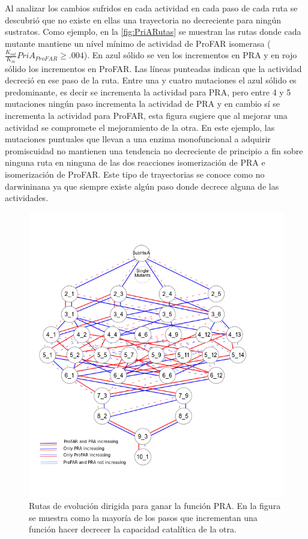 \documentclass[12pt,twoside]{reedthesis}
\begin{document}
  Al analizar los cambios sufridos en cada actividad en cada paso de cada
  ruta se descubrió que no existe en ellas una trayectoria no decreciente
  para ningún sustratos. Como ejemplo, en la \autoref{fig:PriARutas} se
  muestran las rutas donde cada mutante mantiene un nível mínimo de
  actividad de ProFAR isomerasa
  (\(\frac{K_{cat}}{K_m} PriA_{ProFAR} \ge .004\)). En azul sólido se ven
  los incrementos en PRA y en rojo sólido los incrementos en ProFAR. Las
  líneas punteadas indican que la actividad decreció en ese paso de la
  ruta. Entre una y cuatro mutaciones el azul sólido es predominante, es
  decir se incrementa la actividad para PRA, pero entre 4 y 5 mutaciones
  ningún paso incrementa la actividad de PRA y en cambio sí se incrementa
  la actividad para ProFAR, esta figura sugiere que al mejorar una
  actividad se compromete el mejoramiento de la otra. En este ejemplo, las
  mutaciones puntuales que llevan a una enzima monofuncional a adquirir
  promiscuidad no mantienen una tendencia no decreciente de principio a
  fin sobre ninguna ruta en ninguna de las dos reacciones isomerización de
  PRA e isomerización de ProFAR. Este tipo de trayectorias se conoce como
  no darwininana ya que siempre existe algún paso donde decrece alguna de
  las actividades.
  
  \begin{figure}[h!tbp]
  \centering
  \includegraphics[angle = 0,scale = 0.7]{chapter4/LianetFiguras/SolocirculosPRA_PRO_RUTAS_10_1_r002.png}
  \caption[Positive increments on PRA]{\footnotesize{Rutas de evolución dirigida para ganar la función PRA. En la figura se muestra como la mayoría de los pasos que incrementan una función hacer decrecer la capacidad catalítica de la otra. }}
  \label{fig:PRARutas}
  \end{figure}
  
\end{document}
